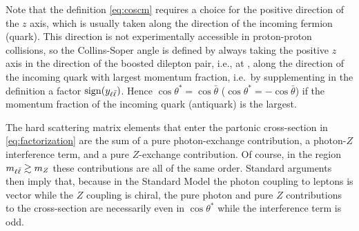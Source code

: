Note that the definition \cref{eq:coscm} requires a choice for the positive
direction of the $z$ axis, which is usually taken along the direction of the
incoming fermion (quark).
%
This direction is  not experimentally accessible in proton-proton collisions,
so the Collins-Soper angle is defined by always taking the positive $z$ axis in
the direction of the boosted dilepton pair, i.e., at \lo, along the direction of
the incoming quark with largest momentum fraction, i.e.\ by supplementing in
the definition a factor $\operatorname{sign}(y_{\ell\bar{\ell}})$.
%
Hence $\cos\theta^*=\cos{\bar\theta}$ ($\cos\theta^*=-\cos{\bar\theta}$)  if
the momentum fraction of the incoming quark (antiquark) is the largest.

%
The hard scattering matrix elements that enter the partonic cross-section
in \cref{eq:factorization} are the sum of a pure photon-exchange
contribution, a photon-$Z$ interference term, and a pure $Z$-exchange
contribution.
%
Of course, in the region
$m_{\ell\bar{\ell}} \gtrsim m_Z$ these contributions are all of the same order.
%
Standard arguments~\cite{Peskin:1995ev} then imply that, because in the
Standard Model the photon
coupling to leptons is vector  while the $Z$ coupling is chiral,
the pure photon and pure $Z$ contributions to the cross-section are
necessarily  even in $\cos\theta^*$ while the interference term is
odd.

